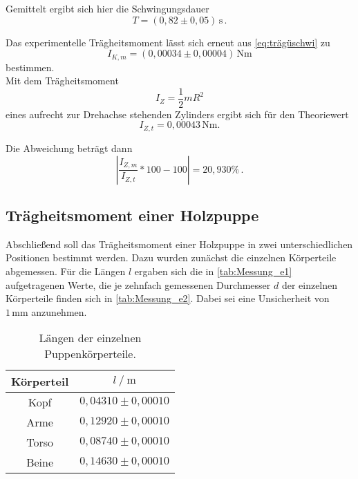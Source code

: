 Gemittelt ergibt sich hier die Schwingungsdauer
\begin{equation*}
  T = (0,82 \pm 0,05) \, \unit{\second} \,.
\end{equation*}

Das experimentelle Trägheitsmoment lässt sich erneut aus \eqref{eq:trägüschwi} zu
\begin{equation*}
  I_{K,m} = (0,00034 \pm 0,00004) \, \unit{\newton\meter}
\end{equation*} 
bestimmen. \\

Mit dem Trägheitsmoment
\begin{equation}
  I_Z = \frac{1}{2} m R^2
\end{equation}
eines aufrecht zur Drehachse stehenden Zylinders ergibt sich für den Theoriewert
\begin{equation*}
  I_{Z,t} = 0,00043 \,  \unit{\newton\meter}.
\end{equation*}

Die Abweichung beträgt dann
\begin{equation*}
  \left|\frac{I_{Z,m}}{I_{Z,t}} * 100 - 100 \right| = 20,930 \% \,.
\end{equation*}

\newpage

\subsection{Trägheitsmoment einer Holzpuppe}
\label{subsec:e}

Abschließend soll das Trägheitsmoment einer Holzpuppe in zwei unterschiedlichen Positionen bestimmt werden. Dazu wurden zunächst die einzelnen Körperteile abgemessen.
Für die Längen $l$ ergaben sich die in \autoref{tab:Messung_e1} aufgetragenen Werte, die je zehnfach gemessenen Durchmesser $d$ der einzelnen Körperteile finden sich in \autoref{tab:Messung_e2}.
Dabei sei eine Unsicherheit von $1 \, \unit{\milli\meter}$ anzunehmen.

\begin{table}[H]
  \centering
  \begin{tabular}{S[table-format=2.0] S[table-format=2.2]}
      \toprule
      {Körperteil} & {$l \mathbin{/} \unit{\meter}$}\\
      \midrule
        {Kopf}  & {$0,04310 \pm 0,00010$} \\
        {Arme}  & {$0,12920 \pm 0,00010$} \\
        {Torso} & {$0,08740 \pm 0,00010$} \\
        {Beine} & {$0,14630 \pm 0,00010$} \\
      \bottomrule
  \end{tabular}
  \caption{Längen der einzelnen Puppenkörperteile.}
  \label{tab:Messung_e1}
\end{table}


